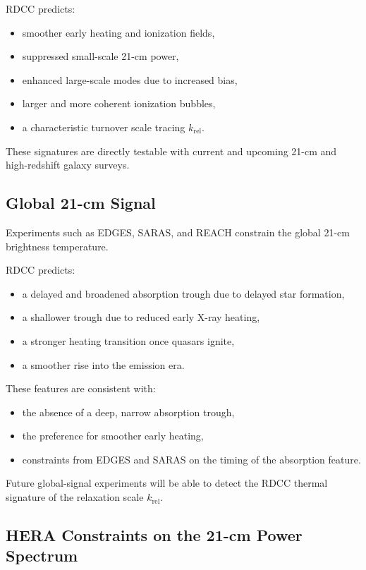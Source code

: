 \documentclass[11pt,a4paper]{article}
\begin{document}
RDCC predicts:
\begin{itemize}
\item smoother early heating and ionization fields,
\item suppressed small-scale 21-cm power,
\item enhanced large-scale modes due to increased bias,
\item larger and more coherent ionization bubbles,
\item a characteristic turnover scale tracing $k_{\mathrm{rel}}$.
\end{itemize}

These signatures are directly testable with current and upcoming 21-cm and high-redshift
galaxy surveys.

\subsection{Global 21-cm Signal}

Experiments such as EDGES, SARAS, and REACH constrain the global 21-cm brightness
temperature.

RDCC predicts:
\begin{itemize}
\item a delayed and broadened absorption trough due to delayed star formation,
\item a shallower trough due to reduced early X-ray heating,
\item a stronger heating transition once quasars ignite,
\item a smoother rise into the emission era.
\end{itemize}

These features are consistent with:
\begin{itemize}
\item the absence of a deep, narrow absorption trough,
\item the preference for smoother early heating,
\item constraints from EDGES and SARAS on the timing of the absorption feature.
\end{itemize}

Future global-signal experiments will be able to detect the RDCC thermal signature of the
relaxation scale $k_{\mathrm{rel}}$.

\subsection{HERA Constraints on the 21-cm Power Spectrum}
\end{document}
